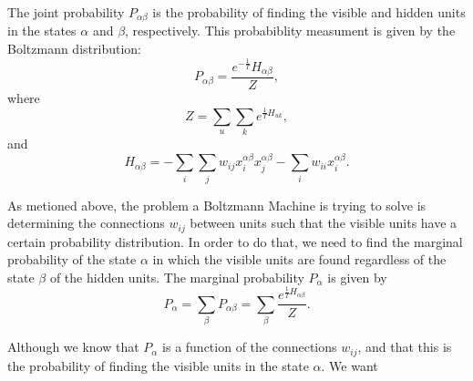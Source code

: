 The joint probability $P_{\alpha \beta}$ is the probability of finding the visible and hidden units in the states $\alpha$ and $\beta$, respectively. This probabiblity measument is given by the Boltzmann distribution:
\begin{equation}
  P_{\alpha \beta} = \frac{e^{-\frac{1}{T}}H_{\alpha \beta}}{Z},
  \label{eq:eq8}
\end{equation}
where
\begin{equation}
  Z = \sum_{u} \sum_{k} e^{\frac{1}{T}H_{u k}},
  \label{eq:eq9}
\end{equation}
and
\begin{equation}
  H_{\alpha \beta} = - \sum_{i} \sum_{j} w_{ij} x^{\alpha \beta}_{i} x^{\alpha \beta}_{j} - \sum_{i} w_{ii} x^{\alpha \beta}_{i}.
  \label{eq:eq10}
\end{equation}

As metioned above, the problem a Boltzmann Machine is trying to solve is determining the connections $w_{ij}$ between units such that the visible units have a certain probability distribution. In order to do that, we need to find the marginal probability of the state $\alpha$ in which the visible units are found regardless of the state $\beta$ of the hidden units. The marginal probability $P_{\alpha}$ is given by
\begin{equation}
  P_{\alpha} = \sum_{\beta} P_{\alpha \beta} = \sum_{\beta} \frac{e^{\frac{1}{T} H_{\alpha \beta}}}{Z}.
  \label{eq:eq11}
\end{equation}

Although we know that $P_{\alpha}$ is a function of the connections $w_{ij}$, and that this is the probability of finding the visible units in the state $\alpha$. We want
